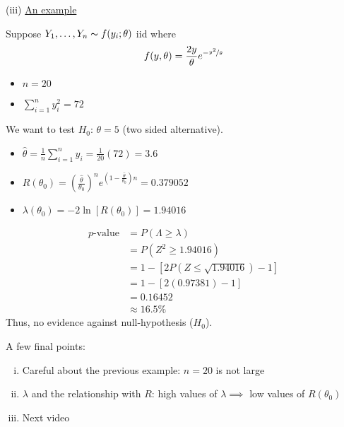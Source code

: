 (iii) \underline{An example}
\begin{exbox}
    \begin{example}
        Suppose $ Y_1,\ldots ,Y_n \thicksim f(y_i;\theta) $ iid where
        \[ f(y,\theta)=\frac{2y}{\theta}e^{-\nicefrac{y^2}{\theta}} \]
        \begin{itemize}
            \item $ n=20 $
            \item $ \sum\limits_{i=1}^{n} y_i^2=72 $
        \end{itemize}

        We want to test $ H_0 $: $ \theta=5 $ (two sided alternative).
        \begin{itemize}
            \item $ \hat{\theta}=\frac{1}{n} \sum\limits_{i=1}^{n}y_i=\frac{1}{20}(72)=3.6 $
            \item $ R(\theta_0)=\left( \frac{\hat{\theta}}{\theta_0} \right)^n
                      e^{\left(1-\frac{\hat{\theta}}{\theta_0}\right)n} = 0.379052 $
            \item $ \lambda(\theta_0) =-2\ln \left[ R(\theta_0) \right]=1.94016 $
        \end{itemize}
        \begin{align*}
            p\text{-value}
             & =P(\Lambda\geqslant \lambda)                       \\
             & =P(Z^2\geqslant 1.94016)                           \\
             & =1-\left[ 2 P(Z\leqslant \sqrt{1.94016})-1 \right] \\
             & = 1-\left[ 2(0.97381)-1 \right]                    \\
             & = 0.16452                                          \\
             & \approx 16.5\%
        \end{align*}
        Thus, no evidence against null-hypothesis ($ H_0 $).
    \end{example}
\end{exbox}
A few final points:
\begin{enumerate}[(i)]
    \item Careful about the previous example:
          \subitem $ n=20 $ is not large
    \item $ \lambda $ and the relationship with $ R $:
          \subitem high values of $ \lambda\implies $ low values of $ R(\theta_0) $
    \item Next video
\end{enumerate}

